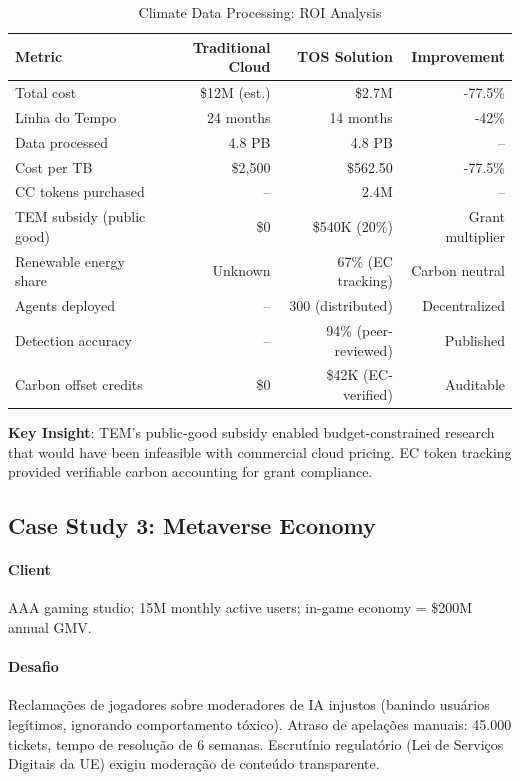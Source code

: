 \documentclass[11pt]{article}
\begin{document}
\begin{itemize}[noitemsep]
\begin{itemize}[noitemsep]
\begin{itemize}[noitemsep]
\begin{table}[H]
\centering
\caption{Climate Data Processing: ROI Analysis}
\label{tab:climate-roi}
\begin{tabular}{@{}lrrr@{}}
\toprule
\textbf{Metric} & \textbf{Traditional Cloud} & \textbf{TOS Solution} & \textbf{Improvement} \\ \midrule
Total cost & \$12M (est.) & \$2.7M & -77.5\% \\
Linha do Tempo & 24 months & 14 months & -42\% \\
Data processed & 4.8 PB & 4.8 PB & -- \\
Cost per TB & \$2,500 & \$562.50 & -77.5\% \\
CC tokens purchased & -- & 2.4M & -- \\
TEM subsidy (public good) & \$0 & \$540K (20\%) & Grant multiplier \\
Renewable energy share & Unknown & 67\% (EC tracking) & Carbon neutral \\
Agents deployed & -- & 300 (distributed) & Decentralized \\
Detection accuracy & -- & 94\% (peer-reviewed) & Published \\
Carbon offset credits & \$0 & \$42K (EC-verified) & Auditable \\
\bottomrule
\end{tabular}
\end{table}

\textbf{Key Insight}: TEM's public-good subsidy enabled budget-constrained research that would have been infeasible with commercial cloud pricing. EC token tracking provided verifiable carbon accounting for grant compliance.

\subsection{Case Study 3: Metaverse Economy}

\paragraph{Client} AAA gaming studio; 15M monthly active users; in-game economy = \$200M annual GMV.

\paragraph{Desafio} Reclamações de jogadores sobre moderadores de IA injustos (banindo usuários legítimos, ignorando comportamento tóxico). Atraso de apelações manuais: 45.000 tickets, tempo de resolução de 6 semanas. Escrutínio regulatório (Lei de Serviços Digitais da UE) exigiu moderação de conteúdo transparente.


\end{itemize}
\end{itemize}
\end{itemize}
\end{document}
